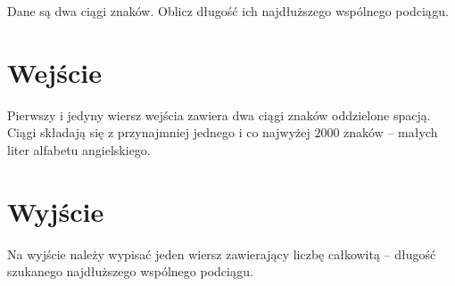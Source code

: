 \documentclass{spiral-kurs}
\begin{document}
\makeheader
%

Dane są dwa ciągi znaków. Oblicz długość ich najdłuższego wspólnego podciągu.

    \section{Wejście}

Pierwszy i jedyny wiersz wejścia zawiera dwa ciągi znaków oddzielone spacją. Ciągi składają się z przynajmniej jednego i co najwyżej $2000$ znaków --
małych liter alfabetu angielskiego.


    \section{Wyjście}

Na wyjście należy wypisać jeden wiersz zawierający liczbę całkowitą -- długość szukanego najdłuższego wspólnego podciągu.


  
\end{document}
